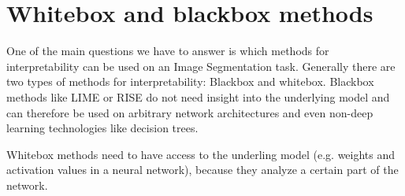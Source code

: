 \section{Whitebox and blackbox methods}
One of the main questions we have to answer is which methods for interpretability can be used on an Image Segmentation task.
Generally there are two types of methods for interpretability: Blackbox and whitebox. Blackbox methods like LIME or RISE do not need insight into the underlying model and can therefore be used on arbitrary network architectures and even non-deep learning technologies like decision trees.

Whitebox methods need to have access to the underling model (e.g. weights and activation values in a neural network), because they analyze a certain part of the network.
